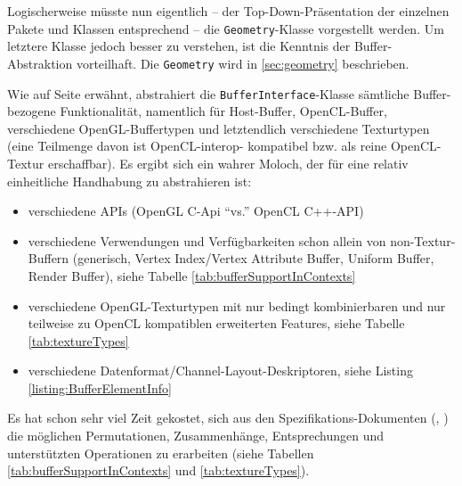 \label{sec:architecture:BufferAbstraction} 	

	Logischerweise müsste nun eigentlich 
	-- der Top-Down-Präsentation der einzelnen Pakete und Klassen entsprechend --
	die \lstinline|Geometry|-Klasse vorgestellt werden. Um letztere Klasse jedoch besser zu verstehen,
	ist die Kenntnis der Buffer-Abstraktion vorteilhaft. Die \lstinline|Geometry| wird in \ref{sec:geometry} beschrieben.
	
	Wie auf Seite \pageref{overview:bufferAbstraction} erwähnt, abstrahiert die \lstinline|BufferInterface|-Klasse
	sämtliche Buffer-bezogene Funktionalität, namentlich für Host-Buffer, OpenCL-Buffer, 
	verschiedene OpenGL-Buffertypen und letztendlich verschiedene Texturtypen (eine Teilmenge davon ist OpenCL-interop-
	kompatibel bzw. als reine OpenCL-Textur erschaffbar).
	Es ergibt sich ein wahrer Moloch, der für eine relativ einheitliche Handhabung zu abstrahieren ist: 
	
	\begin{itemize}
		\item verschiedene APIs (OpenGL C-Api "`vs."' OpenCL C++-API)
		\item verschiedene Verwendungen und Verfügbarkeiten schon allein von non-Textur-Buffern 
			(generisch, Vertex Index/Vertex Attribute Buffer, Uniform Buffer, Render Buffer),
			siehe Tabelle \ref{tab:bufferSupportInContexts}
		\item verschiedene OpenGL-Texturtypen mit nur bedingt kombinierbaren und nur teilweise zu OpenCL kompatiblen 
			erweiterten  Features, siehe Tabelle \ref{tab:textureTypes} 
		\item verschiedene Datenformat/Channel-Layout-Deskriptoren, siehe Listing \ref{listing:BufferElementInfo}
	\end{itemize}	
	
	Es hat schon sehr viel Zeit gekostet, sich aus den Spezifikations-Dokumenten 
	(\cite{openGL_4_1_Spec}, \cite{openCL_1_0_Spec}) die möglichen Permutationen, Zusammenhänge, Entsprechungen
	und unterstützten Operationen zu erarbeiten 
	(siehe Tabellen \ref{tab:bufferSupportInContexts} und \ref{tab:textureTypes}).
	
